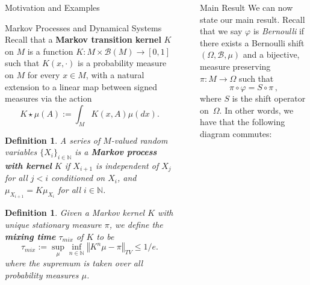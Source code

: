 \documentclass[final,noamsthm]{beamer}
\newtheorem{defn}[ex]{Definition}
\newcommand{\N}{\mathbb{N}}
\newcommand{\norm}[1]{\left\Vert #1\right\Vert}
\newlength{\sepwidth}
\newlength{\colwidth}
\newcommand{\separatorcolumn}{\begin{column}{\sepwidth}\end{column}}
\begin{document}
\begin{frame}[t]
\begin{columns}[t]
\begin{column}{\colwidth}
\begin{block}{Motivation and Examples}
            \end{block}
            \begin{block}{Markov Processes and Dynamical Systems}
                Recall that a \textbf{Markov transition kernel} $K$ on $M$ is a function $K:M \times \mathcal{B}(M) \to [0,1]$ such that
        $K(x,\cdot)$ is a probability measure on $M$ for every $x \in M$, with a natural extension to a linear map between signed measures via the action
    \[
        K\star \mu(A) := \int_{M}K(x,A) \mu(dx).
    \]
    \begin{defn}
        A series of $M$-valued random variables $\{X_i\}_{i \in \N}$ is a \textbf{Markov process with kernel} $K$ if $X_{i+1}$ is independent of $X_j$ for all $j < i$ conditioned on $X_i$, and $\mu_{X_{i+1}} = K \mu_{X_i}$ for all $i \in \N$.
    \end{defn}
    \begin{defn}
    Given a Markov kernel $K$ with unique stationary measure $\pi$, we define the \textbf{mixing time} $\tau_{mix}$ of $K$ to be
    \[
        \tau_{mix} :=\sup_{\mu }\inf_{n \in \N} \norm{K^n \mu - \pi}_{TV} \le 1/e.
    \]
    where the supremum is taken over all probability measures $\mu$.
 
    \end{defn}
            \end{block}

        \end{column}

        \separatorcolumn

        \begin{column}{\colwidth}
            \vspace{-1.5cm}

            \begin{block}{Main Result}
                We can now state our main result.
                Recall that we say $\varphi$ is \emph{Bernoulli} if there exists a Bernoulli shift $(\Omega, \mathcal B, \mu)$ and a bijective, measure preserving $\pi \colon M \to \Omega$ such that
  \begin{equation*}
    \pi \circ \varphi = S \circ \pi\,,
  \end{equation*}
  where $S$ is the shift operator on~$\Omega$.
  In other words, we have that the following diagram commutes:


\end{block}
\end{column}
\end{columns}
\end{frame}
\end{document}
